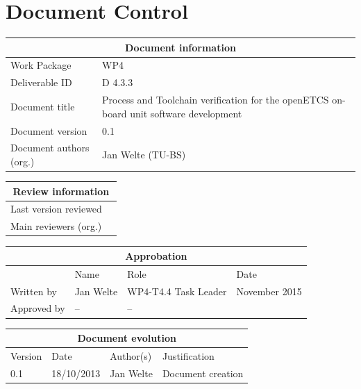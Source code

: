 \documentclass{template/openetcs_report}
\begin{document}
\maketitle
\tableofcontents
\listoffiguresandtables
\newpage

\chapter{Document Control}

\begin{tabular}{|p{4.4cm}|p{8.7cm}|}
\hline
\multicolumn{2}{|c|}{Document information} \\
\hline
Work Package &  WP4  \\
Deliverable ID & D 4.3.3\\
\hline
Document title & Process and Toolchain verification for the openETCS on-board unit software development \\
Document version & 0.1 \\
Document authors (org.)  & Jan Welte (TU-BS)\\
\hline
\end{tabular}

\begin{tabular}{|p{4.4cm}|p{8.7cm}|}
\hline
\multicolumn{2}{|c|}{Review information} \\
\hline
Last version reviewed & \\
\hline
Main reviewers (org.) & \\
\hline
\end{tabular}

\begin{tabular}{|p{2.2cm}|p{4cm}|p{4cm}|p{2cm}|}
\hline
\multicolumn{4}{|c|}{Approbation} \\
\hline
  &  Name & Role & Date   \\
\hline  
Written by    &  Jan Welte & WP4-T4.4 Task Leader  &  November 2015\\
\hline
Approved by & -- & -- & \\
\hline
\end{tabular}

\begin{tabular}{|p{2.2cm}|p{2cm}|p{3cm}|p{5cm}|}
\hline
\multicolumn{4}{|c|}{Document evolution} \\
\hline
Version &  Date & Author(s) & Justification  \\
\hline
0.1 & 18/10/2013 & Jan Welte &  Document creation \\
\hline  
\hline  
\end{tabular}
\newpage
\end{document}
